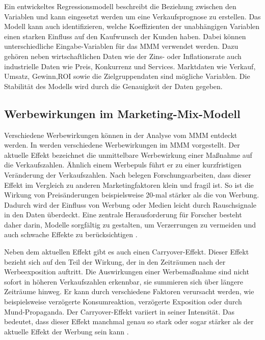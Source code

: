 Ein entwickeltes Regressionsmodell beschreibt die Beziehung zwischen den Variablen und kann eingesetzt werden um eine Verkaufsprognose zu erstellen. Das Modell kann auch identifizieren, welche Koeffizienten der unabhängigen Variablen einen starken Einfluss auf den Kaufwunsch der Kunden haben. Dabei können unterschiedliche Eingabe-Variablen für das \ac{MMM} verwendet werden. Dazu gehören neben wirtschaftlichen Daten wie der Zins- oder Inflationsrate auch industrielle
Daten wie Preis, Konkurrenz und Services. Marktdaten wie Verkauf, Umsatz, Gewinn,\ac{ROI} sowie die Zielgruppendaten sind mögliche Variablen. Die Stabilität des Modells wird durch die Genauigkeit der Daten gegeben. 
\subsection{Werbewirkungen im Marketing-Mix-Modell}
\label{WerbeeffekteImMMM}
Verschiedene Werbewirkungen können in der Analyse vom \ac{MMM} entdeckt werden. In \cite{Pandey2021MMM} werden verschiedene Werbewirkungen im \ac{MMM} vorgestellt. Der aktuelle Effekt bezeichnet die unmittelbare Werbewirkung einer Maßnahme auf die Verkaufszahlen. Ähnlich einem Werbepuls führt er zu einer kurzfristigen Veränderung der Verkaufszahlen. Nach \cite{Pandey2021MMM} belegen Forschungsarbeiten, dass dieser Effekt im Vergleich zu anderen Marketingfaktoren klein und fragil ist. So ist die Wirkung von Preisänderungen beispielsweise 20-mal stärker als die von Werbung. Dadurch wird der Einfluss von Werbung oder Medien leicht durch Rauschsignale in den Daten überdeckt. Eine zentrale Herausforderung für Forscher besteht daher darin, Modelle sorgfältig zu gestalten, um Verzerrungen zu vermeiden und auch schwache Effekte zu berücksichtigen \cite[785]{Pandey2021MMM}. \par
Neben dem aktuellen Effekt gibt es auch einen Carryover-Effekt. Dieser Effekt bezieht sich auf den Teil der Wirkung, der in den Zeiträumen nach der Werbeexposition auftritt. Die Auswirkungen einer Werbemaßnahme sind nicht sofort in höheren Verkaufszahlen erkennbar, sie summieren sich über längere Zeiträume hinweg. Er kann durch verschiedene Faktoren verursacht werden, wie beispielsweise verzögerte Konsumreaktion, verzögerte Exposition oder durch Mund-Propaganda. Der Carryover-Effekt variiert in seiner Intensität. Das bedeutet, dass dieser Effekt manchmal genau so stark oder sogar stärker als der aktuelle Effekt der Werbung sein kann \cite[785]{Pandey2021MMM}.
